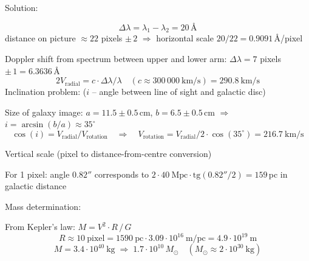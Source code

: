 Solution:

\[ \Delta\lambda = \lambda_1 - \lambda_2 = 20\,\text{\AA} \]
distance on picture ${}\approx 22$ pixels $\pm\,2$ \quad$\Rightarrow$\quad
horizontal scale $20/22 = 0.9091$\,\AA/pixel

Doppler shift from spectrum between upper and lower arm:
$\Delta\lambda = 7$ pixels $\pm\,1 = 6.3636$\,\AA
\[ 2V_{\mathrm{radial}} = c\cdot\Delta\lambda/\lambda \quad
   (c \approx 300\,000\ \mathrm{km/s}) = 290.8\ \mathrm{km/s} \]
Inclination problem: ($i$ -- angle between line of sight and galactic disc)

Size of galaxy image: $a = 11.5 \pm 0.5$\,cm, $b = 6.5 \pm 0.5$\,cm
\quad$\Rightarrow$\quad $i = \arcsin(b/a) \approx 35^\circ$
\[ \cos(i) = V_{\mathrm{radial}}/V_{\mathrm{rotation}}
   \quad\Rightarrow\quad
   V_{\mathrm{rotation}} = V_{\mathrm{radial}}/2\cdot\cos(35^\circ)
   = 216.7\ \mathrm{km/s}
\]

Vertical scale (pixel to distance-from-centre conversion)

For 1 pixel: angle $0.82''$ corresponds to
$2\cdot 40\ \mathrm{Mpc}\cdot\mathrm{tg}(0.82''/2) = 159$\,pc in galactic
distance

Mass determination:

From Kepler's law: $M = V^2\cdot R\,/\,G$
\[ R \approx 10\ \mathrm{pixel} = 1590\ \mathrm{pc}\cdot
   3.09\cdot 10^{16}\ \mathrm{m/pc} = 4.9\cdot 10^{19}\ \mathrm{m} \]
\[ M = 3.4\cdot 10^{40}\ \mathrm{kg} \;\Rightarrow\;
   1.7\cdot 10^{10}\,M_\odot \quad
   (M_\odot \approx 2\cdot 10^{30}\ \mathrm{kg}) \]

